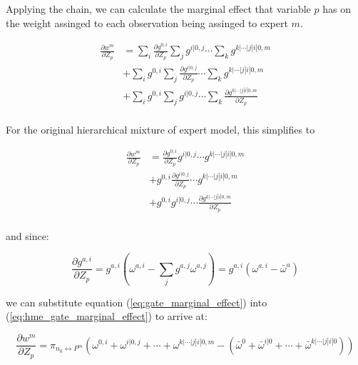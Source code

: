 \documentclass[12pt]{article}
\newcommand{\mean}[1]{\bar{#1}}
\begin{document}
Applying the chain, we can calculate the marginal effect that variable $p$ has on
the weight assinged to each observation being assinged to expert $m$.

\begin{equation}
  \begin{split}
    \frac{\partial w^{m}}{\partial Z_{p}} &= \sum_{i} \frac{\partial g^{0, i}}{\partial Z_{p}} \sum_{j} g^{i|0, j} \cdots \sum_{k} g^{k|\cdots|j|i|0, m} \\
    &+ \sum_{i} g^{0, i} \sum_{j} \frac{\partial g^{i|0, j}}{\partial Z_{p}} \cdots \sum_{k} g^{k|\cdots|j|i|0, m} \\
    &+ \sum_{i} g^{0, i} \sum_{j} g^{i|0, j} \cdots \sum_{k} \frac{\partial g^{k|\cdots|j|i|0, m}}{\partial Z_{p}} \\
  \end{split}
\end{equation}

For the original hierarchical mixture of expert model, this simplifies to

\begin{equation} \label{eq:hme_gate_marginal_effect}
  \begin{split}
    \frac{\partial w^{m}}{\partial Z_{p}} &= \frac{\partial g^{0, i}}{\partial Z_{p}} g^{i|0, j} \cdots g^{k|\cdots|j|i|0, m} \\
    &+ g^{0, i} \frac{\partial g^{i|0, j}}{\partial Z_{p}} \cdots g^{k|\cdots|j|i|0, m} \\
    &+ g^{0, i} g^{i|0, j} \cdots \frac{\partial g^{k|\cdots|j|i|0, m}}{\partial Z_{p}} \\
  \end{split}
\end{equation}

and since:

\begin{equation} \label{eq:gate_marginal_effect}
  \frac{\partial g^{a, i}}{\partial Z_{p}} = g^{a, i}(\omega^{a, i} - \sum_{j} g^{a, j} \omega^{a, j}) = g^{a, i}(\omega^{a, i} - \mean{\omega}^{a})
\end{equation}

we can substitute equation (\ref{eq:gate_marginal_effect}) into
(\ref{eq:hme_gate_marginal_effect}) to arrive at:

\begin{equation}
  \frac{\partial w^{m}}{\partial Z_{p}} = \pi_{n_{0} {\longleftrightarrow} P^{m}} (\omega^{0, i} + \omega^{i|0, j} + \cdots + \omega^{k|\cdots|j|i|0, m} - (\mean{\omega}^{0} + \mean{\omega}^{i|0} + \cdots + \mean{\omega}^{k|\cdots|j|i|0}))
\end{equation}
\end{document}
